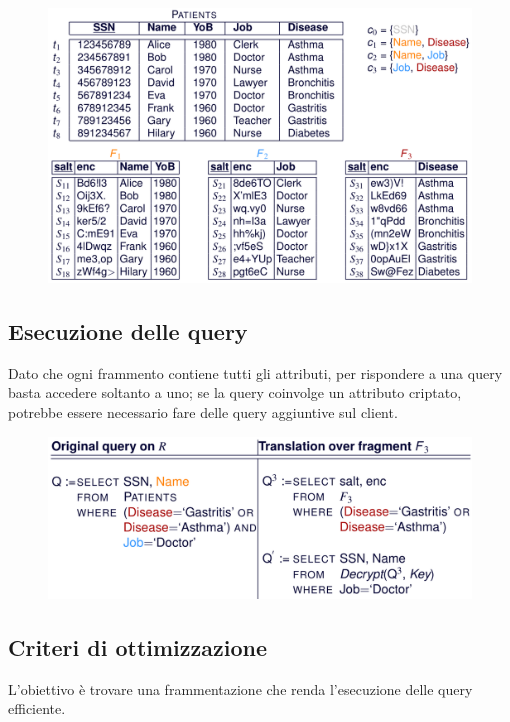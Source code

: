 \documentclass{report}
\begin{document}
\begin{figure}[ht]
    \centering
    \includegraphics[width=1\linewidth]{images/encryption-fragmentation/multi-ex.png}
\end{figure}

\newpage
\subsection{Esecuzione delle query}
Dato che ogni frammento contiene tutti gli attributi, per rispondere a una query 
basta accedere soltanto a uno; se la query coinvolge un attributo criptato, 
potrebbe essere necessario fare delle query aggiuntive sul client.

\begin{figure}[ht]
    \centering
    \includegraphics[width=1\linewidth]{images/encryption-fragmentation/multi-frag-query.png}
\end{figure}

\newpage
\subsection{Criteri di ottimizzazione}
L'obiettivo è trovare una frammentazione che renda l'esecuzione delle query efficiente.
\end{document}
